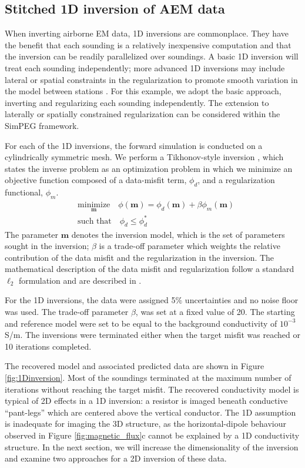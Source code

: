 \documentclass[paper]{geophysics}
\begin{document}
\subsection{Stitched 1D inversion of AEM data}
When inverting airborne EM data, 1D inversions are commonplace. They have the benefit that each sounding is a relatively inexpensive computation and that the inversion can be readily parallelized over soundings. A basic 1D inversion will treat each sounding independently; more advanced 1D inversions may include lateral or spatial constraints in the regularization to promote smooth variation in the model between stations \citep{Viezzoli2008,Viezzoli2009}. For this example, we adopt the basic approach, inverting and regularizing each sounding independently. The extension to laterally or spatially constrained regularization can be considered within the SimPEG framework.

For each of the 1D inversions, the forward simulation is conducted on a cylindrically symmetric mesh. We perform a Tikhonov-style inversion \cite{Tikhonov1977}, which states the inverse problem as an optimization problem in which we minimize an objective function composed of a data-misfit term, $\phi_d$, and a regularization functional, $\phi_m$.
\begin{equation}
\begin{split}
&\underset{\mathbf{m}}{\text{minimize}} \quad \phi(\mathbf{m}) = \phi_d(\mathbf{m}) + \beta \phi_m(\mathbf{m}) \\
&\text{such that} \quad \phi_d \leq \phi_d^*
\end{split}
\label{eq:inverse_problem}
\end{equation}
The parameter $\mathbf{m}$ denotes the inversion model, which is the set of parameters sought in the inversion; $\beta$ is a trade-off parameter which weights the relative contribution of the data misfit and the regularization in the inversion. The mathematical description of the data misfit and regularization follow a standard $\ell_2$ formulation and are described in \cite{cockett2015}.

For the 1D inversions, the data were assigned 5$\%$ uncertainties and no noise floor was used. The trade-off parameter $\beta$, was set at a fixed value of 20. The starting and reference model were set to be equal to the background conductivity of $10^{-3}$ S/m. The inversions were terminated either when the target misfit was reached or 10 iterations completed.

The recovered model and associated predicted data are shown in Figure \ref{fig:1Dinversion}. Most of the soundings terminated at the maximum number of iterations without reaching the target misfit. The recovered conductivity model is typical of 2D effects in a 1D inversion: a resistor is imaged beneath conductive ``pant-legs'' which are centered above the vertical conductor. The 1D assumption is inadequate for imaging the 3D structure, as the horizontal-dipole behaviour observed in Figure \ref{fig:magnetic_flux}c cannot be explained by a 1D conductivity structure. In the next section, we will increase the dimensionality of the inversion and examine two approaches for a 2D inversion of these data.
\end{document}
